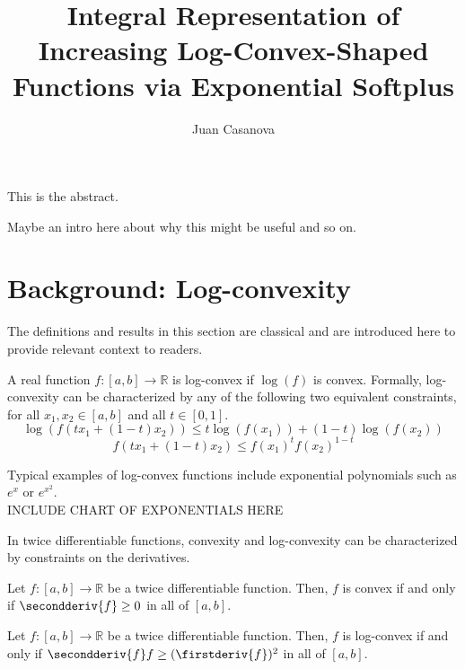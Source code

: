 \documentclass[12pt,a4paper]{article}
\title{Integral Representation of Increasing Log-Convex-Shaped Functions via Exponential Softplus}
\author{Juan Casanova}
\newcommand{\realfunction}[2] {{#1: #2 \rightarrow \mathbb{R}}}
\begin{document}
\maketitle

This is the abstract.

\tableofcontents

Maybe an intro here about why this might be useful and so on.

\section{Background: Log-convexity}

The definitions and results in this section are classical and are introduced here to provide relevant context to readers.

\begin{definition}
A real function $\realfunction{f}{[a,b]}$ is log-convex if $\log(f)$ is convex. Formally, log-convexity can be characterized by any of the following two equivalent constraints, for all $x_1,x_2 \in [a,b]$ and all $t \in [0,1]$.
\begin{equation}
\log(f(t x_1+(1-t) x_2)) \leq t \log(f(x_1)) + (1-t) \log(f(x_2))
\end{equation}
\begin{equation}
f(t x_1 + (1-t) x_2) \leq f(x_1)^{t} f(x_2)^{1-t}
\end{equation}
\end{definition}

Typical examples of log-convex functions include exponential polynomials such as $e^x$ or $e^{x^2}$.\\

INCLUDE CHART OF EXPONENTIALS HERE

In twice differentiable functions, convexity and log-convexity can be characterized by constraints on the derivatives.

\begin{lemma}
Let $\realfunction{f}{[a,b]}$ be a twice differentiable function. Then, $f$ is convex if and only if $\secondderiv{f} \geq 0$ in all of $[a,b]$.
\end{lemma}

\begin{lemma}
Let $\realfunction{f}{[a,b]}$ be a twice differentiable function. Then, $f$ is log-convex if and only if $\secondderiv{f}f \geq (\firstderiv{f})^2$ in all of $[a,b]$.
\end{lemma}
\end{document}

